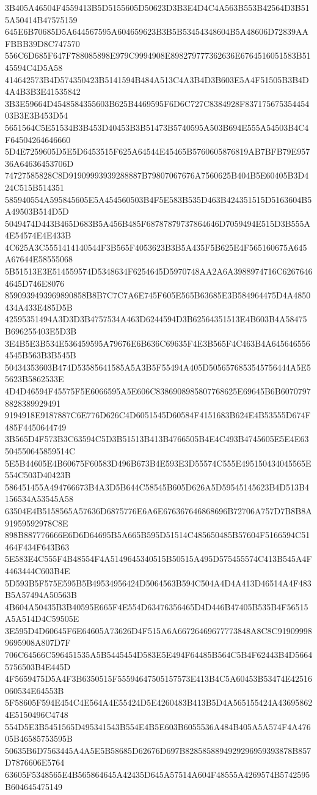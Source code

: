 {{{{{{{{{{{{{{{{{{{{{3B405A46504F4559413B5D5155605D50623D3B3E4D4C4A563B553B42564D3B515A50414B47575159
645E6B70685D5A644567595A604659623B3B5B53454348604B5A48606D72839AAFBBB39D8C747570
556C6D685F647F788085898E979C9994908E898279777362636E6764516051583B5145594C4D5A58
414642573B4D574350423B5141594B484A513C4A3B4D3B603E5A4F51505B3B4D4A4B3B3E41535842
3B3E59664D4548584355603B625B4469595F6D6C727C8384928F83717567535445403B3E3B453D54
5651564C5E51534B3B453D40453B3B51473B5740595A503B694E555A54503B4C4F64504264646660
5D4E7259605D5E5D6453515F625A64544E45465B5760605876819AB7BFB79E95736A64636453706D
74727585828C8D91909993939288887B79807067676A7560625B404B5E60405B3D424C515B514351
585940554A595845605E5A454560503B4F5E583B535D463B424351515D5163604B5A49503B514D5D
5049474D443B465D683B5A456B485F68787879737864646D7059494E515D3B555A4E54574E4E433B
4C625A3C5551414140544F3B565F4053623B3B5A435F5B625E4F565160675A645A67644E58555068
5B51513E3E514559574D5348634F6254645D5970748AA2A6A3988974716C62676464645D746E8076
8590939493969890858B8B7C7C7A6E745F605E565B63685E3B584964475D4A4850434A433E485D5B
42595351494A3D3D3B4757534A463D6244594D3B62564351513E4B603B4A58475B696255403E5D3B
3E4B5E3B534E536459595A79676E6B636C69635F4E3B565F4C463B4A6456465564545B563B3B545B
50434353603B474D53585641585A5A3B5F55494A405D5056576853545756444A5E55623B5862533E
4D4D46594F45575F5E6066595A5E606C8386908985807768625E69645B6B60707978828389929491
9194918E9187887C6E776D626C4D6051545D60584F4151683B624E4B53555D674F485F4450644749
3B565D4F573B3C63594C5D3B51513B413B4766505B4E4C493B4745605E5E4E63504550645859514C
5E5B44605E4B60675F60583D496B673B4E593E3D55574C555E495150434045565E554C503D40423B
586451455A494766673B4A3D5B644C58545B605D626A5D59545145623B4D513B4156534A53545A58
63504E4B5158565A57636D6875776E6A6E676367646868696B72706A757D7B8B8A91959592978C8E
898B887776666E6D6D64695B5A665B595D51514C485650485B57604F5166594C51464F434F643B63
5E583E4C555F4B48554F4A5149645340515B50515A495D575455574C413B545A4F4463444C603B4E
5D593B5F575E595B5B49534956424D5064563B594C504A4D4A413D46514A4F483B5A57494A50563B
4B604A50435B3B40595E665F4E554D63476356465D4D446B47405B535B4F56515A5A514D4C59505E
3E595D4D60645F6E64605A73626D4F515A6A66726469677773848A8C8C919099989695908A807D7F
706C64566C596451535A5B5445454D583E5E494F64485B564C5B4F62443B4D56645756503B4E445D
4F5659475D5A4F3B6350515F55594647505157573E413B4C5A60453B53474E42516060534E64553B
5F58605F594E454C4E564A4E55424D5E4260483B413B5D4A565155424A436958624E5150496C4748
554D5E3B5451565D495341543B554E4B5E603B6055536A484B405A5A574F4A47605B46585753595B
50635B6D7563445A4A5E5B58685D62676D697B8285858894929296959393878B857D7876606E5764
63605F5348565E4B565864645A42435D645A57514A604F48555A4269574B5742595B604645475149
}}}}}}}}}}}}}}}}}}}}}
